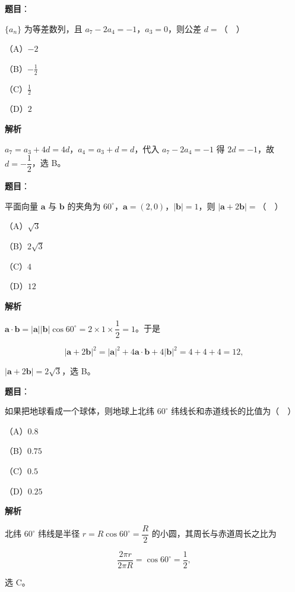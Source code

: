 \begin{answer}

\textbf{题目}：

$\{a_n\}$ 为等差数列，且 $a_7-2a_4=-1$，$a_3=0$，则公差 $d=$（　）

（A）$-2$

（B）$-\frac12$

（C）$\frac12$

（D）$2$

\textbf{解析}

$a_7=a_3+4d=4d$，$a_4=a_3+d=d$，代入 $a_7-2a_4=-1$ 得 $2d=-1$，故 $d=-\dfrac12$，选 B。


\end{answer}
\begin{answer}

\textbf{题目}：

平面向量 $\boldsymbol a$ 与 $\boldsymbol b$ 的夹角为 $60^\circ$，$\boldsymbol a=(2,0)$，$|\boldsymbol b|=1$，则 $|\boldsymbol a+2\boldsymbol b|=$（　）

（A）$\sqrt3$

（B）$2\sqrt3$

（C）$4$

（D）$12$

\textbf{解析}

$\boldsymbol a\cdot\boldsymbol b=|\boldsymbol a||\boldsymbol b|\cos60^\circ=2\times1\times\dfrac12=1$。于是

\nopagebreak[4]
\[|\boldsymbol a+2\boldsymbol b|^2=|\boldsymbol a|^2+4\boldsymbol a\cdot\boldsymbol b+4|\boldsymbol b|^2
=4+4+4=12,\]

$|\boldsymbol a+2\boldsymbol b|=2\sqrt3$，选 B。


\end{answer}
\begin{answer}

\textbf{题目}：

如果把地球看成一个球体，则地球上北纬 $60^\circ$ 纬线长和赤道线长的比值为（　）

（A）$0.8$

（B）$0.75$

（C）$0.5$

（D）$0.25$

\textbf{解析}

北纬 $60^\circ$ 纬线是半径 $r=R\cos60^\circ=\dfrac R2$ 的小圆，其周长与赤道周长之比为

\nopagebreak[4]
\[\frac{2\pi r}{2\pi R}=\cos60^\circ=\frac12,\]

选 C。


\end{answer}
